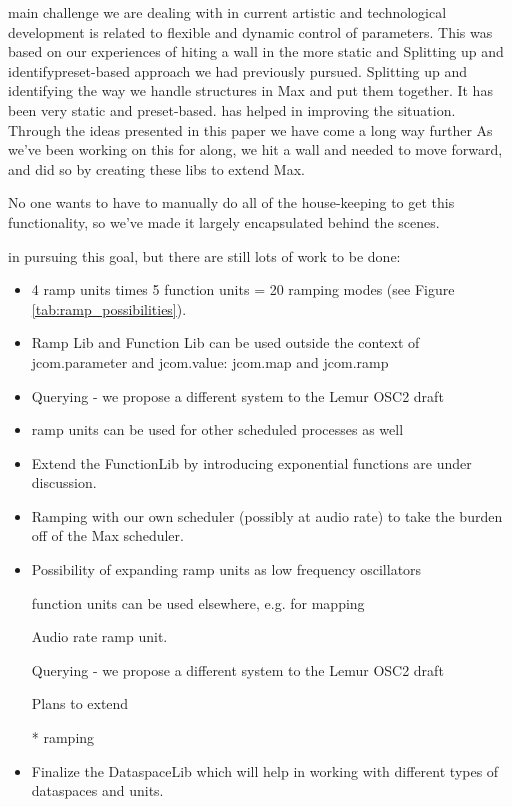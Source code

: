 \documentclass{article}
\begin{document}
main challenge we are dealing with in current artistic and technological development is related to flexible and dynamic control of parameters. This was based on our experiences of hiting a wall in the more static and Splitting up and identifypreset-based approach we had previously pursued. Splitting up and identifying the way we handle structures in Max and put them together.  It has been very static and preset-based.
has helped in improving the situation. Through the ideas presented in this paper we have come a long way further 
As we've been working on this for along, we hit a wall and needed to move forward, and did so by creating these libs to extend Max.  

No one wants to have to manually do all of the house-keeping to get this functionality, so we've made it largely encapsulated behind the scenes.

in pursuing this goal, but there are still lots of work to be done: 

\begin{itemize}
    \item 4 ramp units times 5 function units = 20 ramping modes (see Figure \ref{tab:ramp_possibilities}).
	\vspace{-8pt}
	\item Ramp Lib and Function Lib can be used outside the context of jcom.parameter and jcom.value: jcom.map and jcom.ramp
	\vspace{-8pt}
	\item Querying - we propose a different system to the Lemur OSC2 draft
	\vspace{-8pt}

	\item ramp units can be used for other scheduled processes as well
	\vspace{-8pt}
	\item Extend the FunctionLib by introducing exponential functions are under discussion. 

	\vspace{-8pt}

	\item Ramping with our own scheduler (possibly at audio rate) to take the burden off of the Max scheduler.

	\vspace{-8pt}

	\item Possibility of expanding ramp units as low frequency oscillators

function units can be used elsewhere, e.g. for mapping

Audio rate ramp unit.

Querying - we propose a different system to the Lemur OSC2 draft



Plans to extend %


* ramping 	\vspace{-8pt}
	\item Finalize the DataspaceLib which will help in working with different types of dataspaces and units. 
	\vspace{-8pt}
\end{itemize}
\end{document}
